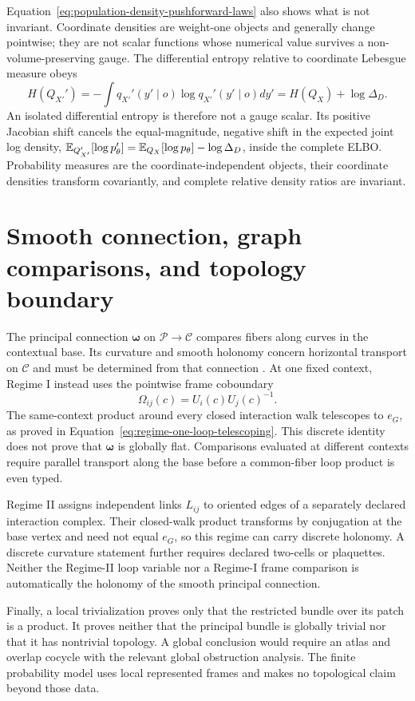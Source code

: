 Equation~\eqref{eq:population-density-pushforward-laws} also shows what is not invariant. Coordinate densities are weight-one objects and generally change pointwise; they are not scalar functions whose numerical value survives a non-volume-preserving gauge. The differential entropy relative to coordinate Lebesgue measure obeys
\begin{equation}
H(Q_{X'}')
=-\int q_{X'}'(y'\mid o)\log q_{X'}'(y'\mid o)dy'
=H(Q_X)+\log\Delta_D.
\label{eq:differential-entropy-gauge-shift}
\end{equation}
An isolated differential entropy is therefore not a gauge scalar. Its positive Jacobian shift cancels the equal-magnitude, negative shift in the expected joint log density, \(\mathbb E_{Q_{X'}'}[\log p_\theta']=\mathbb E_{Q_X}[\log p_\theta]-\log\Delta_D\), inside the complete ELBO. Probability measures are the coordinate-independent objects, their coordinate densities transform covariantly, and complete relative density ratios are invariant.

\section{Smooth connection, graph comparisons, and topology boundary}

The principal connection \(\boldsymbol\omega\) on \(\mathcal P\to\mathcal C\) compares fibers along curves in the contextual base. Its curvature and smooth holonomy concern horizontal transport on \(\mathcal C\) and must be determined from that connection \citep{Kobayashi1963,Nakahara2003}. At one fixed context, Regime I instead uses the pointwise frame coboundary
\begin{equation}
\Omega_{ij}(c)=U_i(c)U_j(c)^{-1}.
\label{eq:information-geometry-regime-one-coboundary}
\end{equation}
The same-context product around every closed interaction walk telescopes to \(e_G\), as proved in Equation~\eqref{eq:regime-one-loop-telescoping}. This discrete identity does not prove that \(\boldsymbol\omega\) is globally flat. Comparisons evaluated at different contexts require parallel transport along the base before a common-fiber loop product is even typed.

Regime II assigns independent links \(L_{ij}\) to oriented edges of a separately declared interaction complex. Their closed-walk product transforms by conjugation at the base vertex and need not equal \(e_G\), so this regime can carry discrete holonomy. A discrete curvature statement further requires declared two-cells or plaquettes. Neither the Regime-II loop variable nor a Regime-I frame comparison is automatically the holonomy of the smooth principal connection.

Finally, a local trivialization proves only that the restricted bundle over its patch is a product. It proves neither that the principal bundle is globally trivial nor that it has nontrivial topology. A global conclusion would require an atlas and overlap cocycle with the relevant global obstruction analysis. The finite probability model uses local represented frames and makes no topological claim beyond those data.
